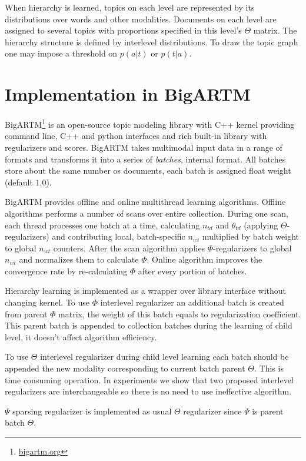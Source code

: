 \documentclass[12pt, twoside]{article}
\begin{document}
When hierarchy is learned, topics on each level are represented by its distributions over words and other modalities. Documents on each level are assigned to several topics with proportions specified in this level's $\Theta$ matrix. The hierarchy structure is defined by interlevel distributions. To draw the topic graph one may impose a threshold on $p(a|t)$ or $p(t|a)$.

\section{Implementation in BigARTM}
BigARTM\footnote{\url{bigartm.org}} is an open-source topic modeling library with C++ kernel providing command line, C++ and python interfaces and rich built-in library with regularizers and scores. \mbox{BigARTM} takes multimodal input data in a range of formats and transforms it into a series of \emph{batches}, internal format. All batches store about the same number os documents, each batch is assigned float weight (default $1.0$).

BigARTM provides offline and online multithread learning algorithms. Offline algorithms performs a number of scans over entire collection. During one scan, each thread processes one batch at a time, calculating $n_{td}$ and $\theta_{td}$ (applying $\Theta$-regularizers) and contributing local, batch-specific $n_{wt}$ multiplied by batch weight to global $n_{wt}$ counters. After the scan algorithm applies $\Phi$-regularizers to global $n_{wt}$ and normalizes them to calculate $\Phi$. Online algorithm improves the convergence rate by re-calculating $\Phi$ after every portion of
batches.

Hierarchy learning is implemented as a wrapper over library interface without changing kernel. To use $\Phi$ interlevel regularizer an additional batch is created from parent $\Phi$ matrix, the weight of this batch equals to regularization coefficient. This parent batch is appended to collection batches during the learning of child level, it doesn't affect algorithm efficiency. 

To use $\Theta$ interlevel regularizer during child level learning each batch should be appended the new modality corresponding to current batch parent $\Theta$. This is time consuming operation. In experiments we show that two proposed interlevel regularizers are interchangeable so there is no need to use ineffective algorithm.

$\Psi$ sparsing regularizer is implemented as usual $\Theta$ regularizer since $\Psi$ is parent batch $\Theta$.  
\end{document}
